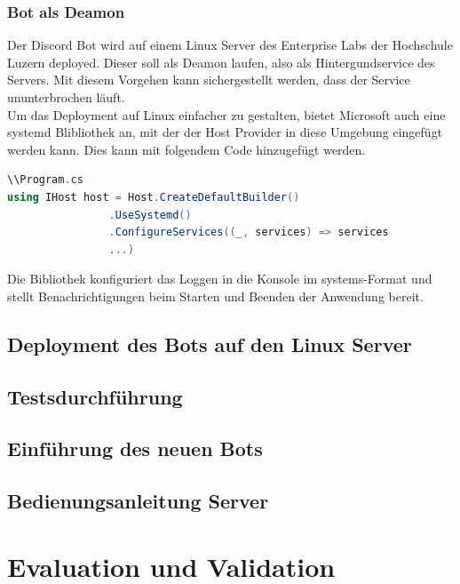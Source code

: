 \documentclass[a4paper, table]{article}
\begin{document}
\subsubsection{Bot als Deamon}
Der Discord Bot wird auf einem Linux Server des Enterprise Labs der Hochschule Luzern deployed.
Dieser soll als Deamon laufen, also als Hintergundservice des Servers.
Mit diesem Vorgehen kann sichergestellt werden, dass der Service ununterbrochen läuft.\\
Um das Deployment auf Linux einfacher zu gestalten, bietet Microsoft auch eine systemd Blibliothek an, 
mit der der Host Provider in diese Umgebung eingefügt werden kann.\autocite{}
Dies kann mit folgendem Code hinzugefügt werden.

\begin{lstlisting}[language=csharp]
\\Program.cs
using IHost host = Host.CreateDefaultBuilder()
                .UseSystemd()
                .ConfigureServices((_, services) => services
                ...)
\end{lstlisting}

Die Bibliothek konfiguriert das Loggen in die Konsole im systems-Format und stellt Benachrichtigungen beim Starten und Beenden der Anwendung bereit.

\newpage
\subsection{Deployment des Bots auf den Linux Server}

\newpage
\subsection{Testsdurchführung}

\newpage
\subsection{Einführung des neuen Bots}

\newpage
\subsection{Bedienungsanleitung Server}

\newpage
\section{Evaluation und Validation}
\end{document}
